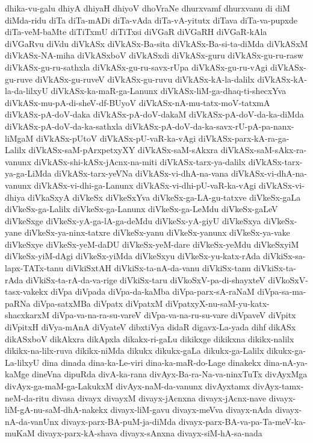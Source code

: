 {dhika-vu-galu
dhiyA
dhiyaH
dhiyoV
dhoVraNe
dhurxvamf
dhurxvanu
di
diM
diMda-ridu
diTa
diTa-mADi
diTa-vAda
diTa-vA-yitutx
diTava
diTa-va-pupxde
diTa-veM-baMte
diTiTxmU
diTiTxsi
diVGaR
diVGaRH
diVGaR-kAla
diVGaRvu
diVdu
diVkASx
diVkASx-Ba-sita
diVkASx-Ba-si-ta-diMda
diVkASxM
diVkASx-NA-miha
diVkASxboV
diVkASxdi
diVkASx-guru
diVkASx-gu-ru-rasw
diVkASx-gu-ru-sathxla
diVkASx-gu-ru-savx-rUpa
diVkASx-gu-ru-vAgi
diVkASx-gu-ruve
diVkASx-gu-ruveV
diVkASx-gu-ruvu
diVkASx-kA-la-dalilx
diVkASx-kA-la-da-lilxyU
diVkASx-ka-maR-ga-Lanunx
diVkASx-liM-ga-dhaq-ti-shecxYva
diVkASx-mu-pA-di-sheV-df-BUyoV
diVkASx-nA-mu-tatx-moV-tatxmA
diVkASx-pA-doV-daka
diVkASx-pA-doV-dakaM
diVkASx-pA-doV-da-ka-diMda
diVkASx-pA-doV-da-ka-sathxla
diVkASx-pA-doV-da-ka-savx-rU-pA-pa-nanx-liMgaM
diVkASx-pUtoV
diVkASx-pU-vaR-ka-vAgi
diVkASx-parx-kA-ra-ga-Lalilx
diVkASx-saM-pArxpetxyXY
diVkASx-saM-sAkxra
diVkASx-saM-sAkx-ra-vanunx
diVkASx-shi-kASx-jAcnx-na-miti
diVkASx-tarx-ya-dalilx
diVkASx-tarx-ya-ga-LiMda
diVkASx-tarx-yeVNa
diVkASx-vi-dhA-na-vana
diVkASx-vi-dhA-na-vanunx
diVkASx-vi-dhi-ga-Lanunx
diVkASx-vi-dhi-pU-vaR-ka-vAgi
diVkASx-vi-dhiya
diVkaSxyA
diVkeSx
diVkeSxYva
diVkeSx-ga-LA-gu-tatxve
diVkeSx-gaLa
diVkeSx-ga-Lalilx
diVkeSx-ga-Lanunx
diVkeSx-ga-LeMdu
diVkeSx-gaLeV
diVkeSxge
diVkeSx-yA-ga-lA-ga-deMdu
diVkeSx-yA-giyU
diVkeSxya
diVkeSx-yane
diVkeSx-ya-ninx-tatxre
diVkeSx-yanu
diVkeSx-yanunx
diVkeSx-ya-vake
diVkeSxye
diVkeSx-yeM-daDU
diVkeSx-yeM-dare
diVkeSx-yeMdu
diVkeSxyiM
diVkeSx-yiM-dAgi
diVkeSx-yiMda
diVkeSxyu
diVkeSx-yu-katx-rAda
diVkiSx-sa-lapx-TATx-tanu
diVkiSxtAH
diVkiSx-ta-nA-da-vanu
diVkiSx-tanu
diVkiSx-ta-rAda
diVkiSx-ta-rA-da-va-rige
diVkiSx-taru
diVkoSxV-pa-di-shayxteV
diVkoSxV-tasx-vakekx
diVpa
diVpada
diVpa-da-kaMba
diVpa-parx-sA-raNaM
diVpa-sa-ma-paRNa
diVpa-satxMBa
diVpatx
diVpatxM
diVpatxyX-nu-saM-yu-katx-shacxkarxM
diVpa-va-na-ra-su-vareV
diVpa-va-na-ru-su-vare
diVpaveV
diVpitx
diVpitxH
diVya-mAnA
diVyateV
dibxtiVya
didaR
digavx-La-yada
dihf
dikASx
dikASxboV
dikAkxra
dikApxla
dikakx-ri-gaLu
dikikxge
dikikxna
dikikx-nalilx
dikikx-na-lilx-ruva
dikikx-niMda
dikukx
dikukx-gaLa
dikukx-ga-Lalilx
dikukx-ga-La-lilxyU
dina
dinada
dina-ka-Le-viri
dina-ka-maR-do-Lage
dinakekx
dina-nA-ya-kaMge
dineVna
dipuRda
divA-ka-rana
divAyx-Ba-ra-Na-va-ninxTuTx
divAyxMga
divAyx-ga-maM-ga-LakukxM
divAyx-naM-da-vanunx
divAyxtamx
divAyx-tamx-neM-da-ritu
divasa
divayx
divayxM
divayx-jAcnxna
divayx-jAcnx-nave
divayx-liM-gA-nu-saM-dhA-nakekx
divayx-liM-gavu
divayx-meVva
divayx-nAda
divayx-nA-da-vanUnx
divayx-parx-BA-puM-ja-diMda
divayx-parx-BA-va-pa-Ta-meV-ka-muKaM
divayx-parx-kA-shava
divayx-sAnxna
divayx-siM-hA-sa-nada
}
